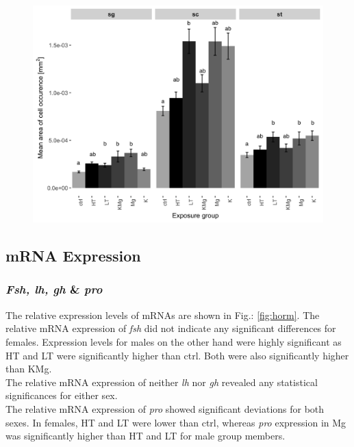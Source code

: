 \documentclass[twoside]{article}
\begin{document}
\begin{multicols}{2}
\begin{figure}[H]
 \centering
 \includegraphics[scale=.1]{ggbarlot_testes133.png}
 \label{fig:tarea}
\end{figure}
\FloatBarrier

\subsection{mRNA Expression}

\subsubsection{\textit{Fsh, lh, gh} \& \textit{pro}}
The relative expression levels of mRNAs are shown in Fig.: \ref{fig:horm}. The relative mRNA expression of \textit{fsh} did not indicate any significant differences for females. Expression levels for males on the other hand were highly significant as HT and LT were significantly higher than ctrl. Both were also significantly higher than KMg. \\
The relative mRNA expression of neither \textit{lh} nor \textit{gh} revealed any statistical significances for either sex.\\
The relative mRNA expression of \textit{pro} showed significant deviations for both sexes. In females, HT and LT were lower than ctrl, whereas \textit{pro} expression in Mg was significantly higher than HT and LT for male group members. 


\end{multicols}
\end{document}
